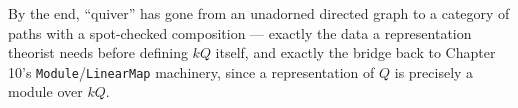 By the end, ``quiver'' has gone from an unadorned directed graph to a category of paths with a spot-checked composition --- exactly the data a representation theorist needs before defining \(kQ\) itself, and exactly the bridge back to Chapter 10's \texttt{Module}/\texttt{LinearMap} machinery, since a representation of \(Q\) is precisely a module over \(kQ\).









